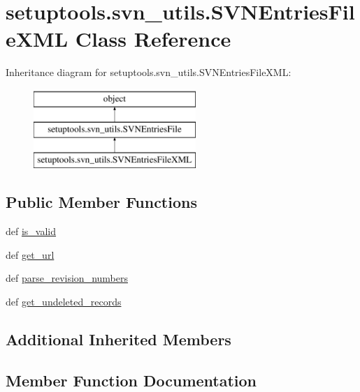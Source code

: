 \hypertarget{classsetuptools_1_1svn__utils_1_1SVNEntriesFileXML}{}\section{setuptools.\+svn\+\_\+utils.\+S\+V\+N\+Entries\+File\+X\+M\+L Class Reference}
\label{classsetuptools_1_1svn__utils_1_1SVNEntriesFileXML}
Inheritance diagram for setuptools.\+svn\+\_\+utils.\+S\+V\+N\+Entries\+File\+X\+M\+L\+:\begin{figure}[H]
\begin{center}
\leavevmode
\includegraphics[height=3.000000cm]{classsetuptools_1_1svn__utils_1_1SVNEntriesFileXML}
\end{center}
\end{figure}
\subsection*{Public Member Functions}
\begin{DoxyCompactItemize}
\item 
def \hyperlink{classsetuptools_1_1svn__utils_1_1SVNEntriesFileXML_ab4f519aac9e2f08ec32448a752acd463}{is\+\_\+valid}
\item 
def \hyperlink{classsetuptools_1_1svn__utils_1_1SVNEntriesFileXML_a6897e4a38baab3f4eca1490b38f26a9a}{get\+\_\+url}
\item 
def \hyperlink{classsetuptools_1_1svn__utils_1_1SVNEntriesFileXML_a138617af8ac467c2ed5e1a6f491caf78}{parse\+\_\+revision\+\_\+numbers}
\item 
def \hyperlink{classsetuptools_1_1svn__utils_1_1SVNEntriesFileXML_a2221ccd5720a19d1d1c24e1192b6533d}{get\+\_\+undeleted\+\_\+records}
\end{DoxyCompactItemize}
\subsection*{Additional Inherited Members}


\subsection{Member Function Documentation}
\hypertarget{classsetuptools_1_1svn__utils_1_1SVNEntriesFileXML_a2221ccd5720a19d1d1c24e1192b6533d}{}

